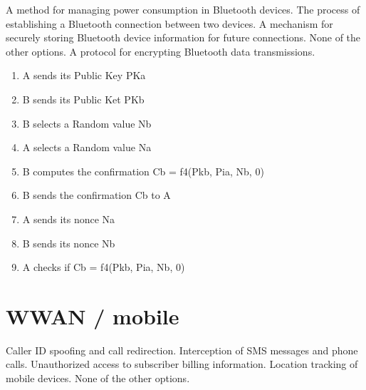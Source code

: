 \begin{questions}
    \begin{checkboxes}
        \choice A method for managing power consumption in Bluetooth devices.
        \CorrectChoice The process of establishing a Bluetooth connection between two devices.
        \choice A mechanism for securely storing Bluetooth device information for future connections.
        \choice None of the other options.
        \choice A protocol for encrypting Bluetooth data transmissions.
    \end{checkboxes}


    \begin{solution}
        \begin{enumerate}
            \item A sends its Public Key PKa
            \item B sends its Public Ket PKb
            \item B selects a Random value Nb
            \item A selects a Random value Na
            \item B computes the confirmation Cb = f4(Pkb, Pia, Nb, 0)
            \item B sends the confirmation Cb to A
            \item A sends its nonce Na
            \item B sends its nonce Nb
            \item A checks if Cb = f4(Pkb, Pia, Nb, 0)
        \end{enumerate}
    \end{solution}

    \section{WWAN / mobile}



    \begin{checkboxes}
        \CorrectChoice Caller ID spoofing and call redirection.
        \CorrectChoice Interception of SMS messages and phone calls.
        \choice Unauthorized access to subscriber billing information.
        \choice Location tracking of mobile devices.
        \choice None of the other options.
    \end{checkboxes}


\end{questions}
